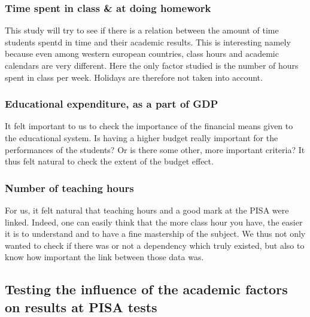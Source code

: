 \documentclass[12pt,a4paper]{article}
\begin{document}
\subsubsection{Time spent in class \& at doing homework}

This study will try to see if there is a relation between the amount of time students spentd in time and their academic results. This is interesting namely because even among western european countries, class hours and academic calendars are very different. Here the only factor studied is the number of hours spent in class per week. Holidays are therefore not taken into account.

\subsubsection{Educational expenditure, as a part of GDP}

It felt important to us to check the importance of the financial means given to the educational system. Is having a higher budget really important for the performances of the students? Or is there some other, more important criteria? It thus felt natural to check the extent of the budget effect. 

\subsubsection{Number of teaching hours}

For us, it felt natural that teaching hours and a good mark at the PISA were linked. Indeed, one can easily think that the more class hour you have, the easier it is to understand and to have a fine mastership of the subject. We thus not only wanted to check if there was or not a dependency which truly existed, but also to know how important the link between those data was.

\subsection{Testing the influence of the academic factors on results at PISA tests}
\end{document}
